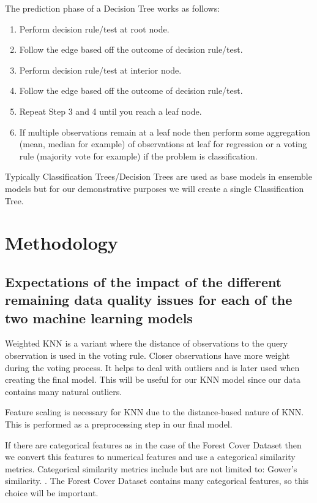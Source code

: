 \documentclass[conference]{IEEEtran}
\begin{document}
The prediction phase of a Decision Tree works as follows\cite[p.~122]{fundamentals}:

\begin{enumerate}
	\item Perform decision rule/test at root node.
	\item Follow the edge based off the outcome of decision rule/test.
	\item Perform decision rule/test at interior node.
	\item Follow the edge based off the outcome of decision rule/test.
	\item Repeat Step 3 and 4 until you reach a leaf node.
	\item If multiple observations remain at a leaf node then perform some aggregation (mean, median for example) of observations at leaf for regression or a voting rule (majority vote for example) if the problem is classification. 
\end{enumerate}

Typically Classification Trees/Decision Trees are used as base models in ensemble models but for our demonstrative purposes we will create a single Classification Tree.


\section{Methodology}

\subsection{Expectations of the impact of the different remaining data quality issues for each of the two machine learning models}

Weighted KNN is a variant where the distance of observations to the query observation is used in the voting rule. Closer observations have more weight during the voting process. It helps to deal with outliers and is later used when creating the final model. This will be useful for our KNN model since our data contains many natural outliers.

Feature scaling is necessary for KNN due to the distance-based nature of KNN. This is performed as a preprocessing step in our final model.

If there are categorical features as in the case of the Forest Cover Dataset then we convert this features to numerical features and use a categorical similarity metrics. Categorical similarity metrics include but are not limited to: Gower's similarity. \cite[p.~14-15]{similarity}. The Forest Cover Dataset contains many categorical features, so this choice will be important.
\end{document}
